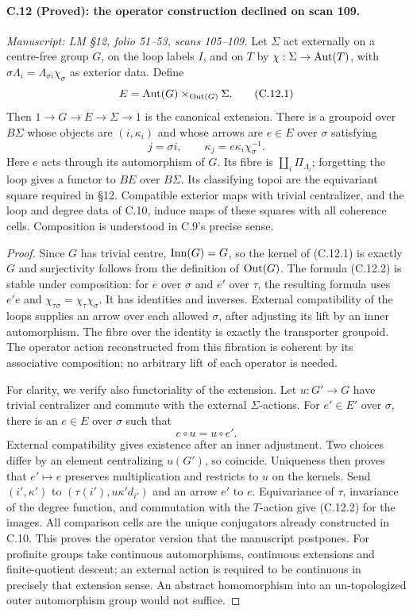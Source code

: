 \paragraph{C.12 (Proved): the operator construction declined on scan 109.}\label{C12}
\textit{Manuscript: LM \S12, folio 51--53, scans 105--109.}
Let $\Sigma$ act externally on a
centre-free group $G$, on the
loop labels $I$, and on $T$ by
$\chi:\Sigma\to\mathrm{Aut}(T)$, with
$\sigma\Lambda_i=\Lambda_{\sigma i}\chi_\sigma$
as exterior data. Define
\[
 E=\mathrm{Aut}(G)\times_{\mathrm{Out}(G)}\Sigma.
                                                               \tag{C.12.1}
\]
Then $1\to G\to E\to\Sigma\to1$
is the canonical extension.
There is a groupoid over $B\Sigma$
whose objects are $(i,\kappa_i)$
and whose arrows are $e\in E$
over $\sigma$ satisfying
\[
 j=\sigma i,\qquad
 \kappa_j=e\kappa_i\chi_\sigma^{-1}.
                                                               \tag{C.12.2}
\]
Here $e$ acts through its
automorphism of $G$. Its fibre
is $\coprod_i\Pi_{\Lambda_i}$;
forgetting the loop gives a
functor to $BE$ over $B\Sigma$.
Its classifying topoi are the
equivariant square required in
\S12. Compatible exterior maps
with trivial centralizer, and
the loop and degree data of
C.10, induce maps of these
squares with all coherence
cells. Composition is understood
in C.9's precise sense.

\begin{proof}
Since $G$ has trivial centre,
$\mathrm{Inn}(G)=G$, so the kernel of
(C.12.1) is exactly $G$ and
surjectivity follows from the
definition of $\mathrm{Out}(G)$. The
formula (C.12.2) is stable under
composition: for $e$ over
$\sigma$ and $e'$ over $\tau$,
the resulting formula uses
$e'e$ and
$\chi_{\tau\sigma}=\chi_\tau\chi_\sigma$.
It has identities and inverses.
External compatibility of the
loops supplies an arrow over
each allowed $\sigma$, after
adjusting its lift by an inner
automorphism. The fibre over
the identity is exactly the
transporter groupoid. The
operator action reconstructed
from this fibration is coherent
by its associative composition;
no arbitrary lift of each
operator is needed.

For clarity, we verify also
functoriality of the extension.
Let $u:G'\to G$ have trivial
centralizer and commute with
the external $\Sigma$-actions.
For $e'\in E'$ over $\sigma$,
there is an $e\in E$ over
$\sigma$ such that
\[
                  e\circ u=u\circ e'.
\]
External compatibility gives
existence after an inner
adjustment. Two choices differ
by an element centralizing
$u(G')$, so coincide. Uniqueness
then proves that $e'\mapsto e$
preserves multiplication and
restricts to $u$ on the kernels.
Send $(i',\kappa')$ to
$(\tau(i'),u\kappa'd_{i'})$
and an arrow $e'$ to $e$.
Equivariance of $\tau$, invariance
of the degree function, and
commutation with the $T$-action
give (C.12.2) for the images.
All comparison cells are the
unique conjugators already
constructed in C.10. This
proves the operator version
that the manuscript postpones.
For profinite groups take
continuous automorphisms,
continuous extensions and
finite-quotient descent; an
external action is required
to be continuous in precisely
that extension sense. An
abstract homomorphism into an
un-topologized outer automorphism
group would not suffice.
\end{proof}
